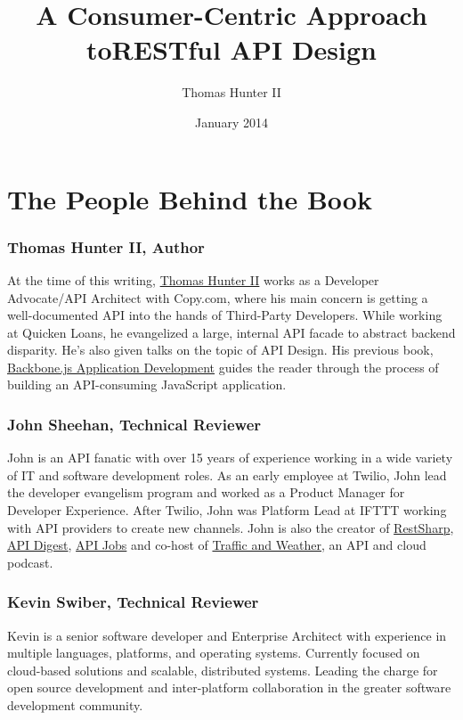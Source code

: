 \documentclass{book}
\title{A Consumer-Centric Approach to\newline{}RESTful API Design}
\author{Thomas Hunter II}
\date{January 2014}
\begin{document}
\maketitle

\section*{The People Behind the Book}

\subsubsection*{Thomas Hunter II, Author}

At the time of this writing, \href{http://thomashunter.name}{Thomas Hunter II} works as a Developer Advocate/API Architect with Copy.com, where his main concern is getting a well-documented API into the hands of Third-Party Developers. While working at Quicken Loans, he evangelized a large, internal API facade to abstract backend disparity. He's also given talks on the topic of API Design. His previous book, \href{http://amzn.to/1aqVRvq}{Backbone.js Application Development} guides the reader through the process of building an API-consuming JavaScript application.

\subsubsection*{John Sheehan, Technical Reviewer}

John is an API fanatic with over 15 years of experience working in a wide variety of IT and software development roles. As an early employee at Twilio, John lead the developer evangelism program and worked as a Product Manager for Developer Experience. After Twilio, John was Platform Lead at IFTTT working with API providers to create new channels. John is also the creator of \href{https://www.github.com/restsharp/restsharp}{RestSharp}, \href{http://www.apidigest.com/}{API Digest}, \href{http://www.api-jobs.com/}{API Jobs} and co-host of \href{http://trafficandweather.io/}{Traffic and Weather}, an API and cloud podcast.

\subsubsection*{Kevin Swiber, Technical Reviewer}

Kevin is a senior software developer and Enterprise Architect with experience in multiple languages, platforms, and operating systems. Currently focused on cloud-based solutions and scalable, distributed systems. Leading the charge for open source development and inter-platform collaboration in the greater software development community.
\end{document}
